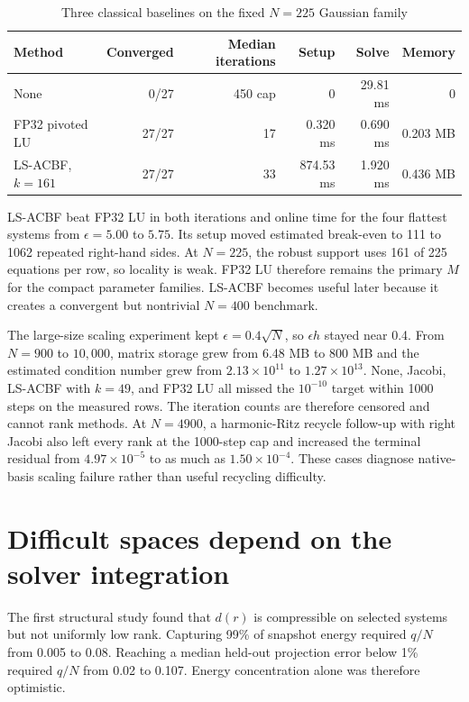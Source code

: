 \documentclass[11pt]{article}
\begin{document}
\begin{table}[H]
\centering
\caption{Three classical baselines on the fixed $N=225$ Gaussian family}
\label{tab:classical}
\small
\begin{tabularx}{\textwidth}{X r r r r r}
\toprule
Method & Converged & Median iterations & Setup & Solve & Memory \\
\midrule
None & 0/27 & 450 cap & 0 & 29.81 ms & 0 \\
FP32 pivoted LU & 27/27 & 17 & 0.320 ms & 0.690 ms & 0.203 MB \\
LS-ACBF, $k=161$ & 27/27 & 33 & 874.53 ms & 1.920 ms & 0.436 MB \\
\bottomrule
\end{tabularx}
\end{table}

LS-ACBF beat FP32 LU in both iterations and online time for the four flattest systems from $\epsilon=5.00$ to $5.75$. Its setup moved estimated break-even to 111 to 1062 repeated right-hand sides. At $N=225$, the robust support uses 161 of 225 equations per row, so locality is weak. FP32 LU therefore remains the primary $M$ for the compact parameter families. LS-ACBF becomes useful later because it creates a convergent but nontrivial $N=400$ benchmark.

The large-size scaling experiment kept $\epsilon=0.4\sqrt N$, so $\epsilon h$ stayed near 0.4. From $N=900$ to $10{,}000$, matrix storage grew from 6.48 MB to 800 MB and the estimated condition number grew from $2.13\times10^{11}$ to $1.27\times10^{13}$. None, Jacobi, LS-ACBF with $k=49$, and FP32 LU all missed the $10^{-10}$ target within 1000 steps on the measured rows. The iteration counts are therefore censored and cannot rank methods. At $N=4900$, a harmonic-Ritz recycle follow-up with right Jacobi also left every rank at the 1000-step cap and increased the terminal residual from $4.97\times10^{-5}$ to as much as $1.50\times10^{-4}$. These cases diagnose native-basis scaling failure rather than useful recycling difficulty.

\section{Difficult spaces depend on the solver integration}

The first structural study found that $d(r)$ is compressible on selected systems but not uniformly low rank. Capturing 99\% of snapshot energy required $q/N$ from 0.005 to 0.08. Reaching a median held-out projection error below 1\% required $q/N$ from 0.02 to 0.107. Energy concentration alone was therefore optimistic.
\end{document}
